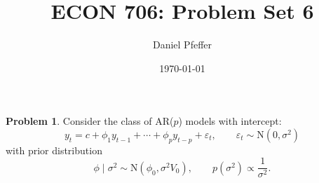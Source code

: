 \documentclass[oneside,reqno]{amsart}
\title{ECON 706: Problem Set 6}
\author{Daniel Pfeffer}
\date{\today}
\newcommand{\eps}{\varepsilon}
\newcommand{\N}{\mathrm N}
\theoremstyle{definition}
\newtheorem{prob}{Problem}
\begin{document}
\maketitle

\begin{prob}
Consider the class of AR($p$) models with intercept: 
\begin{equation}\label{eq:arp}
	y_t =  c +\phi_1 y_{t-1} + \cdots + \phi_p y_{t-p} + \eps_t, 
	\qquad 
	\eps_t \sim \N(0, \sigma^2)
\end{equation}
with prior distribution 
\begin{equation}\label{eq:arp-prior}
	\phi \mid \sigma^2 \sim \N(\phi_0, \sigma^2 V_0),
	\qquad 
	p(\sigma^2) \propto \frac{1}{\sigma^2}. 
\end{equation}
\end{prob}
\end{document}

